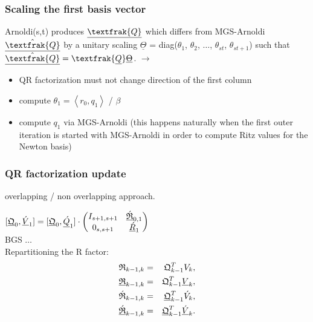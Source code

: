 \documentclass{scrartcl}
\begin{document}
\subsubsection{Scaling the first basis vector} \label{sec:scaling_first_basis_vec}
Arnoldi(s,t) produces $\underline{\textfrak{Q}}$ which differs from MGS-Arnoldi $\underline{\hat{\textfrak{Q}}}$ by a unitary scaling $\underline{\Theta}$ = diag($\theta_1$, $\theta_2$, $\ldots$, $\theta_{st}$, $\theta_{st+1}$) such that $\underline{\hat{\textfrak{Q}}} = \textfrak{\underline{Q}}\underline{\Theta}$. $\rightarrow$
\begin{itemize}
\item QR factorization must not change direction of the first column
\item compute $\theta_1 = \left< r_0, q_1 \right>$ / $\beta$
\item compute $q_1$ via MGS-Arnoldi (this happens naturally when the first outer iteration is started with MGS-Arnoldi in order to compute Ritz values for the Newton basis)
\end{itemize}
\subsubsection{QR factorization update}
overlapping / non overlapping approach.

$[\underline{\frak{Q}}_0, \underline{\acute{V}}_1 ] = [\underline{\frak{Q}}_0, \underline{\acute{Q}}_1 ] \cdot 
\begin{pmatrix}
	I_{s + 1, s + 1} & \underline{\acute{\frak{R}}}_{0,1} \\
	0_{s,s + 1} & \underline{\acute{R}}_1 \\
\end{pmatrix}$ \\

BGS $\ldots$\\

Repartitioning the R factor:
\begin{eqnarray*}
	\frak{R}_{k - 1, k} &=& \frak{Q}_{k - 1}^TV_k,\\
	\underline{\frak{R}}_{k - 1, k} &=& \frak{Q}_{k - 1}^T\underline{V}_k,\\
	\frak{\acute{R}}_{k - 1, k} &=& \underline{\frak{Q}}_{k - 1}^T\acute{V}_k,\\
	\underline{\frak{\acute{R}}}_{k - 1, k} &=& \underline{\frak{Q}}_{k - 1}^T\underline{\acute{V}}_k.
\end{eqnarray*}
\end{document}
